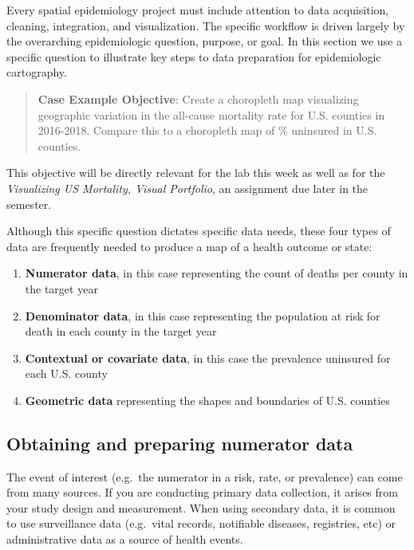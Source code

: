 \documentclass[
]{book}
\providecommand{\tightlist}{%
  \setlength{\itemsep}{0pt}\setlength{\parskip}{0pt}}
\begin{document}
Every spatial epidemiology project must include attention to data acquisition, cleaning, integration, and visualization. The specific workflow is driven largely by the overarching epidemiologic question, purpose, or goal. In this section we use a specific question to illustrate key steps to data preparation for epidemiologic cartography.

\begin{quote}
\textbf{Case Example Objective}: Create a choropleth map visualizing geographic variation in the all-cause mortality rate for U.S. counties in 2016-2018. Compare this to a choropleth map of \% uninsured in U.S. counties.
\end{quote}

This objective will be directly relevant for the lab this week as well as for the \emph{Visualizing US Mortality, Visual Portfolio}, an assignment due later in the semester.

Although this specific question dictates specific data needs, these four types of data are frequently needed to produce a map of a health outcome or state:

\begin{enumerate}
\def\labelenumi{\arabic{enumi}.}
\tightlist
\item
  \textbf{Numerator data}, in this case representing the count of deaths per county in the target year
\item
  \textbf{Denominator data}, in this case representing the population at risk for death in each county in the target year
\item
  \textbf{Contextual or covariate data}, in this case the prevalence uninsured for each U.S. county
\item
  \textbf{Geometric data} representing the shapes and boundaries of U.S. counties
\end{enumerate}

\hypertarget{obtaining-and-preparing-numerator-data}{%
\subsection{Obtaining and preparing numerator data}\label{obtaining-and-preparing-numerator-data}}

The event of interest (e.g.~the numerator in a risk, rate, or prevalence) can come from many sources. If you are conducting primary data collection, it arises from your study design and measurement. When using secondary data, it is common to use surveillance data (e.g.~vital records, notifiable diseases, registries, etc) or administrative data as a source of health events.
\end{document}
